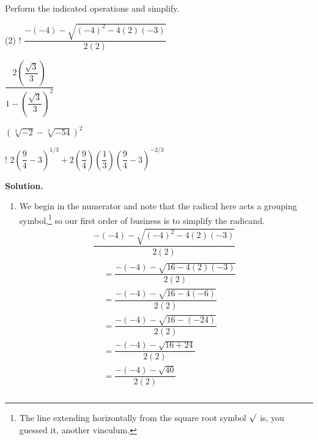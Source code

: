 \begin{ex}  Perform the indicated operations and simplify. 

\begin{tasks}(2)
\task!  $\dfrac{-(-4) - \sqrt{(-4)^2-4(2)(-3)}}{2(2)}$

\task  $\dfrac{2 \left( \dfrac{\sqrt{3}}{3}\right)}{1 - \left( \dfrac{\sqrt{3}}{3} \right)^2}$

\task  $(\sqrt[3]{-2} - \sqrt[3]{-54})^2$

\task!  $2 \left(\dfrac{9}{4} - 3\right)^{1/3} + 2\left(\dfrac{9}{4}\right)\left(\dfrac{1}{3}\right)\left(\dfrac{9}{4}-3\right)^{-2/3}$

\end{tasks}

{\bf Solution.}  

\begin{enumerate}

\item  We begin in the numerator and note that the radical here acts a grouping symbol,\footnote{The line extending horizontally from the square root symbol $\sqrt{\vphantom{2}}$ is, you guessed it, another vinculum.} so our first order of business is to simplify the radicand.
\begin{multline*}
\dfrac{-(-4) -\sqrt{(-4)^2-4(2)(-3)}}{2(2)} \\
\begin{aligned}
& = \dfrac{-(-4) - \sqrt{16-4(2)(-3)}}{2(2)} \\
& = \dfrac{-(-4) - \sqrt{16-4(-6)}}{2(2)} \\
& = \dfrac{-(-4) - \sqrt{16-(-24)}}{2(2)} \\
& = \dfrac{-(-4) - \sqrt{16+24}}{2(2)} \\
& = \dfrac{-(-4) - \sqrt{40}}{2(2)} \\
\end{aligned} 
\end{multline*}



\end{enumerate}
\end{ex}
